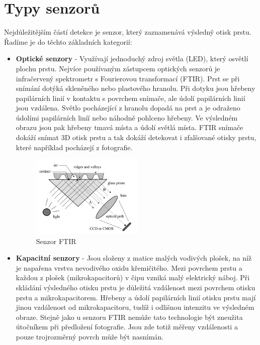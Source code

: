 \section{Typy senzorů}
Nejdůležitějším částí detekce je senzor, který zaznamenává výsledný otisk prstu. Řadíme je do těchto základních kategorií:
\begin{itemize}
\item \textbf{Optické senzory} - Využívají jednoduchý zdroj světla (LED), který osvětlí plochu prstu. \cite{Drahansky} Nejvíce používaným zástupcem optických senzorů je infračervený spektrometr s Fourierovou transformací (FTIR). Prst se při snímání dotýká skleněného nebo plastového hranolu. Při dotyku jsou hřebeny papilárních linií v kontaktu s povrchem snímače, ale údolí papilárních linií jsou vzdálena. Světlo pocházející z hranolu dopadá na prst a je odraženo údolími papilárních liníí nebo náhodně pohlceno hřebeny. Ve výsledném obrazu jsou pak hřebeny tmavá místa a údolí světlá místa. FTIR snímače dokáží snímat 3D otisk prstu a tak dokáží detekovat i zfalšované otisky prstu, které například pocházejí z fotografie. \cite{Maltoni2009}

\begin{figure}[!htbp]
    \centering
    \includegraphics[width=200px]{obrazky-figures/ftiredit.png}
    \caption{Senzor FTIR \cite{Maltoni2009}}
\end{figure}

\item \textbf{Kapacitní senzory} - Jsou složeny z matice malých vodivých plošek, na níž je napařena vrstva nevodivého oxidu křemičitého. \cite{Drahansky} Mezi povrchem prstu a každou z plošek (mikrokapacitorů) v čipu vzniká malý elektrický náboj. Při skládání výsledného otisku prstu je důležitá vzdálenost mezi povrchem otisku prstu a mikrokapacitorem. Hřebeny a údolí papilárních linií otisku prstu mají jinou vzdálenost od mikrokapacitoru, tudíž i odlišnou intenzitu ve výsledném obraze. Stejně jako u senzoru FTIR nemůže tato technologie být zneužita útočníkem při předložení fotografie. Jsou zde totiž měřeny vzdálenosti a pouze trojrozměrný povrch může být nasnímán. \cite{Maltoni2009}


\end{itemize}
